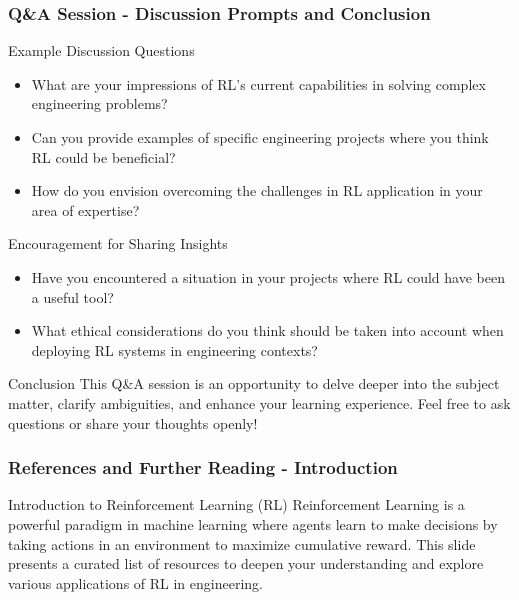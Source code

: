 \documentclass[aspectratio=169]{beamer}
\begin{document}
\begin{frame}[fragile]
    \frametitle{Q\&A Session - Discussion Prompts and Conclusion}
    \begin{block}{Example Discussion Questions}
        \begin{itemize}
            \item What are your impressions of RL's current capabilities in solving complex engineering problems?
            \item Can you provide examples of specific engineering projects where you think RL could be beneficial?
            \item How do you envision overcoming the challenges in RL application in your area of expertise?
        \end{itemize}
    \end{block}

    \begin{block}{Encouragement for Sharing Insights}
        \begin{itemize}
            \item Have you encountered a situation in your projects where RL could have been a useful tool?
            \item What ethical considerations do you think should be taken into account when deploying RL systems in engineering contexts?
        \end{itemize}
    \end{block}

    \begin{block}{Conclusion}
        This Q\&A session is an opportunity to delve deeper into the subject matter, clarify ambiguities, and enhance your learning experience. 
        Feel free to ask questions or share your thoughts openly!
    \end{block}
\end{frame}

\begin{frame}[fragile]
  \frametitle{References and Further Reading - Introduction}
  
  \begin{block}{Introduction to Reinforcement Learning (RL)}
      Reinforcement Learning is a powerful paradigm in machine learning where agents learn to make decisions by taking actions in an environment to maximize cumulative reward.
      This slide presents a curated list of resources to deepen your understanding and explore various applications of RL in engineering.
  \end{block}
  
\end{frame}
\end{document}
